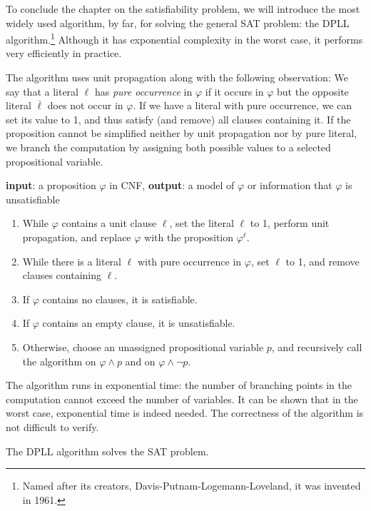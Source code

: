 To conclude the chapter on the satisfiability problem, we will introduce the most widely used algorithm, by far, for solving the general SAT problem: the DPLL algorithm.\footnote{Named after its creators, Davis-Putnam-Logemann-Loveland, it was invented in 1961.} Although it has exponential complexity in the worst case, it performs very efficiently in practice.

The algorithm uses unit propagation along with the following observation: We say that a literal $\ell$ has \emph{pure occurrence} in $\varphi$ if it occurs in $\varphi$ but the opposite literal $\overline{\ell}$ does not occur in $\varphi$. If we have a literal with pure occurrence, we can set its value to 1, and thus satisfy (and remove) all clauses containing it. If the proposition cannot be simplified neither by unit propagation nor by pure literal, we branch the computation by assigning both possible values to a selected propositional variable.

\begin{algorithm}[DPLL]
    \textbf{input}: a proposition $\varphi$ in CNF, \textbf{output}: a model of $\varphi$ or information that $\varphi$ is unsatisfiable
    \begin{enumerate}                
        \item While $\varphi$ contains a unit clause $\ell$, set the literal $\ell$ to 1, perform unit propagation, and replace $\varphi$ with the proposition $\varphi^\ell$.
        \item While there is a literal $\ell$ with pure occurrence in $\varphi$, set $\ell$ to 1, and remove clauses containing $\ell$.
        \item If $\varphi$ contains no clauses, it is satisfiable.
        \item If $\varphi$ contains an empty clause, it is unsatisfiable.
        \item Otherwise, choose an unassigned propositional variable $p$, and recursively call the algorithm on $\varphi\land p$ and on $\varphi\land \neg p$.
    \end{enumerate}
\end{algorithm}

The algorithm runs in exponential time: the number of branching points in the computation cannot exceed the number of variables. It can be shown that in the worst case, exponential time is indeed needed. The correctness of the algorithm is not difficult to verify.

\begin{proposition}
    The DPLL algorithm solves the SAT problem.
\end{proposition}
    
